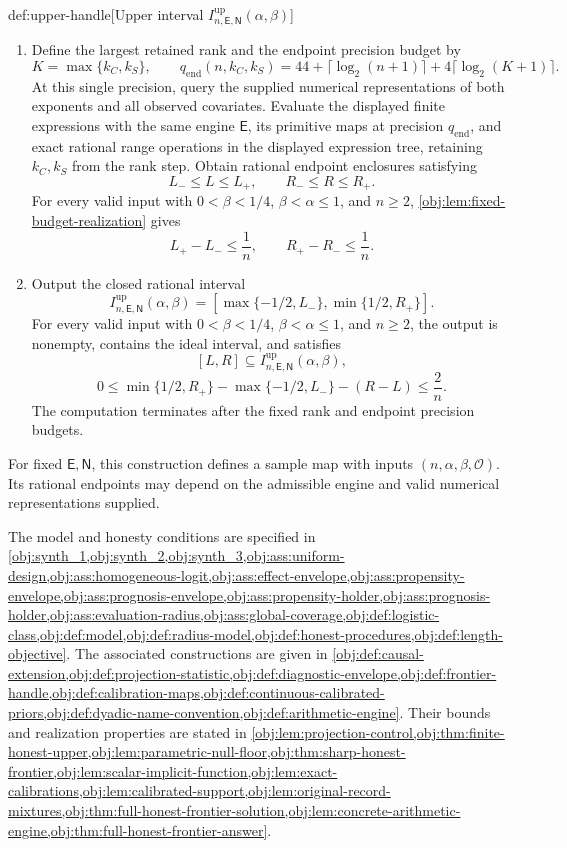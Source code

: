 \documentclass[11pt]{article}
\begin{document}
\begin{algorithmv}{def:upper-handle}[Upper interval $I^{\mathrm{up}}_{n,\mathsf E,\mathsf N}(\alpha,\beta)$]
\begin{enumerate}
\item Define the largest retained rank and the endpoint precision budget by
\[
K=\max\{k_C,k_S\},
\qquad
q_{\mathrm{end}}(n,k_C,k_S)
=44+\lceil\log_2(n+1)\rceil
+4\lceil\log_2(K+1)\rceil.
\]
At this single precision, query the supplied numerical representations of both exponents and all observed covariates. Evaluate the displayed finite expressions with the same engine \(\mathsf E\), its primitive maps at precision \(q_{\mathrm{end}}\), and exact rational range operations in the displayed expression tree, retaining \(k_C,k_S\) from the rank step. Obtain rational endpoint enclosures satisfying
\[
L_-\le L\le L_+,
\qquad
R_-\le R\le R_+.
\]
For every valid input with \(0<\beta<1/4\), \(\beta<\alpha\le1\), and \(n\ge2\), \cref{obj:lem:fixed-budget-realization} gives
\[
L_+-L_-\le\frac1n,
\qquad
R_+-R_-\le\frac1n.
\]

\item Output the closed rational interval
\[
I^{\mathrm{up}}_{n,\mathsf E,\mathsf N}(\alpha,\beta)
=
\left[
\max\{-1/2,L_-\},
\min\{1/2,R_+\}
\right].
\]
For every valid input with \(0<\beta<1/4\), \(\beta<\alpha\le1\), and \(n\ge2\), the output is nonempty, contains the ideal interval, and satisfies
\[
[L,R]\subseteq
I^{\mathrm{up}}_{n,\mathsf E,\mathsf N}(\alpha,\beta),
\]
\[
0\le
\min\{1/2,R_+\}-\max\{-1/2,L_-\}-(R-L)
\le\frac2n.
\]
The computation terminates after the fixed rank and endpoint precision budgets.
\end{enumerate}
For fixed \(\mathsf E,\mathsf N\), this construction defines a sample map with inputs \((n,\alpha,\beta,\mathcal O)\). Its rational endpoints may depend on the admissible engine and valid numerical representations supplied.

The model and honesty conditions are specified in \cref{obj:synth_1,obj:synth_2,obj:synth_3,obj:ass:uniform-design,obj:ass:homogeneous-logit,obj:ass:effect-envelope,obj:ass:propensity-envelope,obj:ass:prognosis-envelope,obj:ass:propensity-holder,obj:ass:prognosis-holder,obj:ass:evaluation-radius,obj:ass:global-coverage,obj:def:logistic-class,obj:def:model,obj:def:radius-model,obj:def:honest-procedures,obj:def:length-objective}. The associated constructions are given in \cref{obj:def:causal-extension,obj:def:projection-statistic,obj:def:diagnostic-envelope,obj:def:frontier-handle,obj:def:calibration-maps,obj:def:continuous-calibrated-priors,obj:def:dyadic-name-convention,obj:def:arithmetic-engine}. Their bounds and realization properties are stated in \cref{obj:lem:projection-control,obj:thm:finite-honest-upper,obj:lem:parametric-null-floor,obj:thm:sharp-honest-frontier,obj:lem:scalar-implicit-function,obj:lem:exact-calibrations,obj:lem:calibrated-support,obj:lem:original-record-mixtures,obj:thm:full-honest-frontier-solution,obj:lem:concrete-arithmetic-engine,obj:thm:full-honest-frontier-answer}.
\end{algorithmv}
\end{document}
